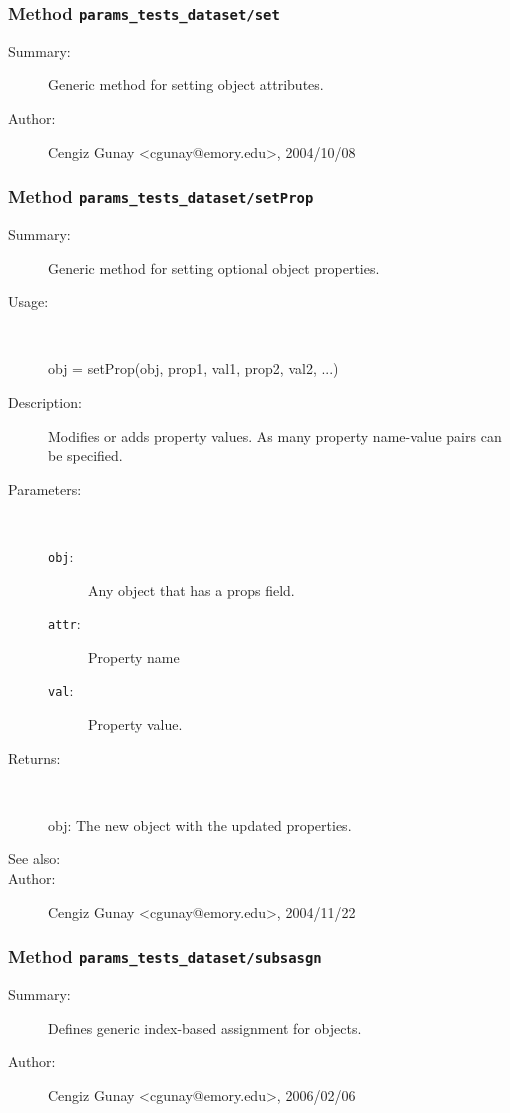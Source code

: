 \subsubsection[Method \texttt{set}]{Method \texttt{params\_tests\_dataset/set}}%
%
\label{ref_params_tests_dataset__set}%
\hypertarget{ref_params_tests_dataset__set}{}%
\begin{description}
\item[Summary:]Generic method for setting object attributes.
%
%
%
%
%
%
%
\item[Author:]%
Cengiz Gunay <cgunay@emory.edu>, 2004/10/08
%
\end{description}
\methodline%
\subsubsection[Method \texttt{setProp}]{Method \texttt{params\_tests\_dataset/setProp}}%
%
\label{ref_params_tests_dataset__setProp}%
\hypertarget{ref_params_tests_dataset__setProp}{}%
\begin{description}
\item[Summary:]Generic method for setting optional object properties.
%
\item[Usage:]~%
\begin{lyxcode}%
obj = setProp(obj, prop1, val1, prop2, val2, ...)
%
\end{lyxcode}%
%
\item[Description:]%
Modifies or adds property values. As many property name-value 
 pairs can be specified.
\item[Parameters:]~
\begin{description}%
\item[\texttt{obj}:]
 Any object that has a props field.
\item[\texttt{attr}:]
 Property name
\item[\texttt{val}:]
 Property value.
\end{description}%
%
\item[Returns:
]~

	obj: The new object with the updated properties.
%
%
\item[See also:]%
%
\item[Author:]%
Cengiz Gunay <cgunay@emory.edu>, 2004/11/22
%
\end{description}
\methodline%
\subsubsection[Method \texttt{subsasgn}]{Method \texttt{params\_tests\_dataset/subsasgn}}%
%
\label{ref_params_tests_dataset__subsasgn}%
\hypertarget{ref_params_tests_dataset__subsasgn}{}%
\begin{description}
\item[Summary:]Defines generic index-based assignment for objects.
%
%
%
%
%
%
%
\item[Author:]%
Cengiz Gunay <cgunay@emory.edu>, 2006/02/06
%
\end{description}
\methodline%
